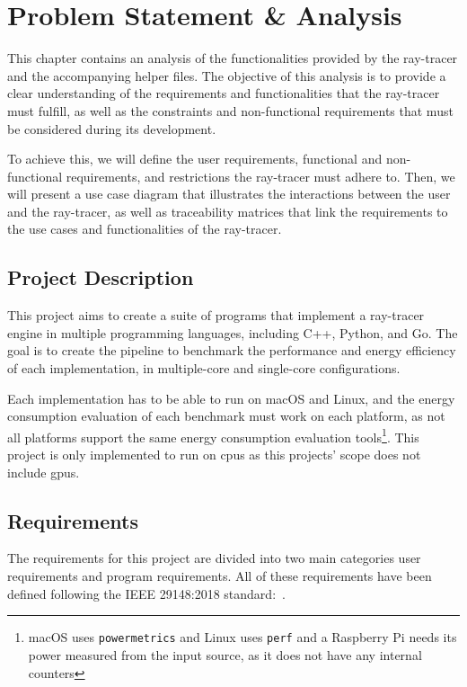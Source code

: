 \chapter{Problem Statement \& Analysis}\label{chap:analysis}

This chapter contains an analysis of the functionalities provided by the ray-tracer and the accompanying helper files. The objective of this analysis is to provide a clear understanding of the requirements and functionalities that the ray-tracer must fulfill, as well as the constraints and non-functional requirements that must be considered during its development.

To achieve this, we will define the user requirements, functional and non-functional requirements, and restrictions the ray-tracer must adhere to. Then, we will present a use case diagram that illustrates the interactions between the user and the ray-tracer, as well as traceability matrices that link the requirements to the use cases and functionalities of the ray-tracer.

\section{Project Description}
This project aims to create a suite of programs that implement a ray-tracer engine in multiple programming languages, including C++, Python, and Go. The goal is to create the pipeline to benchmark the performance and energy efficiency of each implementation, in multiple-core and single-core configurations.

Each implementation has to be able to run on macOS and Linux, and the energy consumption evaluation of each benchmark must work on each platform, as not all platforms support the same energy consumption evaluation tools\footnote{macOS uses \texttt{powermetrics} and Linux uses \texttt{perf} and a Raspberry Pi needs its power measured from the input source, as it does not have any internal counters}. This project is only implemented to run on \glspl{cpu} as this projects' scope does not include \glspl{gpu}.


\section{Requirements}


The requirements for this project are divided into two main categories user requirements and program requirements. All of these requirements have been defined following the IEEE 29148:2018 standard:~\autocite{requirements-engineering-iso}. 

